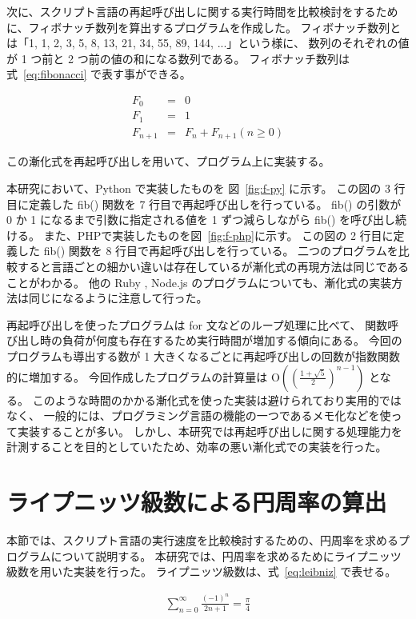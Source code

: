 次に、スクリプト言語の再起呼び出しに関する実行時間を比較検討をするために、フィボナッチ数列を算出するプログラムを作成した。
フィボナッチ数列とは「1, 1, 2, 3, 5, 8, 13, 21, 34, 55, 89, 144, ...」という様に、
数列のそれぞれの値が 1 つ前と 2 つ前の値の和になる数列である。
フィボナッチ数列は式~\ref{eq:fibonacci} で表す事ができる。

\begin{eqnarray}
\label{eq:fibonacci}
  F_{0}&=&0 \nonumber \\
  F_{1}&=&1 \\
  F_{n+1}&=&F_{n}+F_{n+1}(n≥0)\nonumber
\end{eqnarray}

この漸化式を再起呼び出しを用いて、プログラム上に実装する。

本研究において、Python で実装したものを 図~\ref{fig:f-py} に示す。
この図の 3 行目に定義した fib() 関数を 7 行目で再起呼び出しを行っている。
fib() の引数が 0 か 1 になるまで引数に指定される値を 1 ずつ減らしながら fib() を呼び出し続ける。
また、PHPで実装したものを図~\ref{fig:f-php}に示す。
この図の 2 行目に定義した fib() 関数を 8 行目で再起呼び出しを行っている。
二つのプログラムを比較すると言語ごとの細かい違いは存在しているが漸化式の再現方法は同じであることがわかる。
他の Ruby , Node.js のプログラムについても、漸化式の実装方法は同じになるように注意して行った。

再起呼び出しを使ったプログラムは for 文などのループ処理に比べて、
関数呼び出し時の負荷が何度も存在するため実行時間が増加する傾向にある。
今回のプログラムも導出する数が 1 大きくなるごとに再起呼び出しの回数が指数関数的に増加する。
今回作成したプログラムの計算量は O$((\frac{1 +\sqrt{5}}{2})^{n-1})$ となる。
このような時間のかかる漸化式を使った実装は避けられており実用的ではなく、
一般的には、プログラミング言語の機能の一つであるメモ化などを使って実装することが多い。
しかし、本研究では再起呼び出しに関する処理能力を計測することを目的としていたため、効率の悪い漸化式での実装を行った。

\section{ライプニッツ級数による円周率の算出}
\label{cha:program:leibniz}

本節では、スクリプト言語の実行速度を比較検討するための、円周率を求めるプログラムについて説明する。
本研究では、円周率を求めるためにライプニッツ級数を用いた実装を行った。
ライプニッツ級数は、式~\ref{eq:leibniz} で表せる。

\begin{eqnarray} \label{eq:leibniz}
\sum_{n=0}^{\infty}\frac{(-1)^n}{2n+1}=\frac{\pi}{4}
\end{eqnarray}

